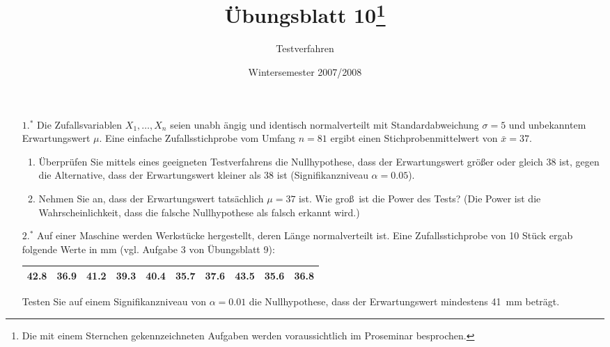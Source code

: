 \documentclass{article}
\begin{document}
\title{\"{U}bungsblatt 10\thanks{%
Die mit einem Sternchen gekennzeichneten Aufgaben werden voraussichtlich im
Proseminar besprochen.}}
\author{Testverfahren}
\date{Wintersemester 2007/2008}
\maketitle

\begin{enumerate}
\item[$1.^{\ast }$] Die Zufallsvariablen $X_{1},\ldots ,X_{n}$ seien unabh%
\"{a}ngig und identisch normalverteilt mit Standardabweichung $\sigma =5$
und unbekanntem Erwartungswert $\mu $. Eine einfache Zufallsstichprobe vom
Umfang $n=81$ ergibt einen Stichprobenmittelwert von $\bar{x}=37$.

\begin{enumerate}
\item \"{U}berpr\"{u}fen Sie mittels eines geeigneten Testverfahrens die
Nullhypothese, dass der Erwartungswert gr\"{o}\ss er oder gleich 38 ist,
gegen die Alternative, dass der Erwartungswert kleiner als 38 ist
(Signifikanzniveau $\alpha =0.05$).

\item Nehmen Sie an, dass der Erwartungswert tats\"{a}chlich $\mu =37$ ist.
Wie gro\ss\ ist die Power des Tests? (Die Power ist die Wahrscheinlichkeit,
dass die falsche Nullhypothese als falsch erkannt wird.)
\end{enumerate}

\item[$2.^{\ast }$] Auf einer Maschine werden Werkst\"{u}cke hergestellt,
deren L\"{a}nge normalverteilt ist. Eine Zufallsstichprobe von 10 St\"{u}ck
ergab folgende Werte in mm (vgl. Aufgabe 3 von \"{U}bungsblatt 9):

\begin{center}%
\begin{tabular}{|c|c|c|c|c|c|c|c|c|c|}
\hline
42.8 & 36.9 & 41.2 & 39.3 & 40.4 & 35.7 & 37.6 & 43.5 & 35.6 & 36.8 \\ \hline
\end{tabular}
\end{center}%

Testen Sie auf einem Signifikanzniveau von $\alpha =0.01$ die Nullhypothese,
dass der Erwartungswert mindestens 41~mm betr\"{a}gt.


\end{enumerate}
\end{document}
